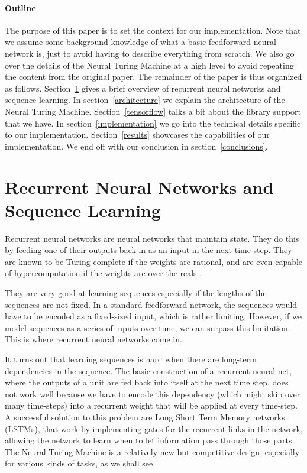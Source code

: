 \documentclass[12pt]{article}
\begin{document}
\paragraph{Outline}

The purpose of this paper is to set the context for our implementation.
Note that we assume some background knowledge of what a basic feedforward
neural network is, just to avoid having to describe everything from scratch.
We also go over the details of the Neural Turing Machine at a high level to
avoid repeating the content from the original paper.
The remainder of the paper is thus organized as follows.
Section~\ref{sequence} gives a brief overview of recurrent
neural networks and sequence learning.
In section~\ref{architecture} we explain the architecture of the Neural
Turing Machine. Section~\ref{tensorflow} talks a bit about the library
support that we have. In section~\ref{implementation} we
go into the technical details specific to our implementation.
Section~\ref{results} showcases the capabilities of our implementation.
We end off with our conclusion in section~\ref{conclusions}.

\section{Recurrent Neural Networks and Sequence Learning}\label{sequence}

Recurrent neural networks are neural networks that maintain state. They
do this by feeding one of their outputs back in as an input in the next time
step. They are known to be Turing-complete \cite{Siegelmann:1992:CPN:130385.130432}
if the weights are rational, and are even capable of hypercomputation
if the weights are over the reals \cite{SIEGELMANN1994331}.

They are very good at learning sequences especially if the lengths of
the sequences are not fixed. In a standard feedforward network, the
sequences would have to be encoded as a fixed-sized input, which is rather
limiting. However, if we model sequences as a series of inputs over time,
we can surpass this limitation. This is where recurrent neural networks come
in.

It turns out that learning sequences is hard when there are long-term
dependencies in the sequence. The basic construction of a recurrent
neural net, where the outputs of a unit are fed back into itself at the next
time step, does not work well because we have to encode this dependency
(which might skip over many time-steps) into a recurrent weight that will be applied at every
time-step. A successful solution to this problem are Long Short Term Memory
networks (LSTMs), that work by implementing gates for the recurrent 
links in the network, allowing the network to learn when to let information
pass through those parts. The Neural Turing Machine is a relatively new
but competitive design, especially for various kinds of tasks, as we
shall see.
\end{document}

